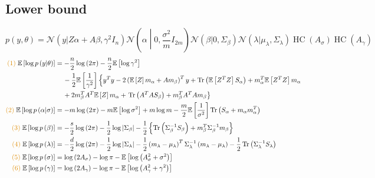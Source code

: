 \documentclass[11pt]{article}
\DeclareMathOperator{\Tr}{Tr}
\newcommand{\opn}{\operatorname}
\begin{document}
\subsection{Lower bound}
$$
  p\left(y, \theta \right) = \mathcal{N}\left(y|Z\alpha + A\beta, \gamma^{2}I_{n}\right) \mathcal{N}\left(\alpha \middle|0, \frac{\sigma^{2}}{m}I_{2m}\right)\mathcal{N}\left(\beta|0,\Sigma_{\beta}\right)\mathcal{N}\left(\lambda|\mu_{\lambda},\Sigma_{\lambda}\right)\operatorname{HC}\left(A_{\sigma}\right)\opn{HC}\left(A_{\gamma}\right)
$$
\begin{align*}
  \textcolor{myorange}{(1)}\;\mathbb{E}\left[\log p\left(y|\theta \right)\right] &= -\frac{n}{2}\log \left(2\pi \right) - \frac{n}{2}\mathbb{E}\left[\log \gamma^{2}\right] \\
  & \,\quad - \frac{1}{2}\mathbb{E}\left[\frac{1}{\gamma^{2}}\right] \left\{y^{T}y -2 \left(\mathbb{E}\left[Z\right]m_{\alpha}+Am_{\beta} \right)^{T}y + \Tr\left(\mathbb{E}\left[Z^{T}Z\right]S_{\alpha} \right) +m_{\alpha}^{T}\mathbb{E}\left[Z^{T}Z\right]m_{\alpha}\right. \\
  &\quad\, + 2m_{\beta}^{T}A^{T}\mathbb{E}\left[Z\right]m_{\alpha} + \left. \Tr\left(A^{T}A S_{\beta}\right) + m_{\beta}^{T}A^{T}A m_{\beta} \right\}\\
  \textcolor{myorange}{(2)}\;\mathbb{E}\left[\log p \left(\alpha|\sigma\right)\right] &= -m \log \left(2\pi \right) -m \mathbb{E}\left[\log \sigma^{2}\right] +m\log m -\frac{m}{2}\mathbb{E}\left[\frac{1}{\sigma^{2}}\right]\Tr \left(S_{\alpha} +m_{\alpha}m_{\alpha}^{T}\right)\\
  \textcolor{myorange}{(3)}\;\mathbb{E}\left[\log p\left(\beta\right)\right] &= -\frac{s}{2}\log \left(2\pi \right) -\frac{1}{2}\log \left|\Sigma_{\beta}\right| -\frac{1}{2}\left\{\Tr \left(\Sigma_{\beta}^{-1}S_{\beta}\right) +m_{\beta}^{T}\Sigma_{\beta}^{-1}m_{\beta} \right\}\\
  \textcolor{myorange}{(4)}\;\mathbb{E}\left[\log p\left(\lambda\right)\right] &= -\frac{d}{2}\log  \left(2\pi \right) -\frac{1}{2}\log \left|\Sigma_{\lambda}\right| -\frac{1}{2}\left(m_{\lambda}-\mu_{\lambda}\right)^{T}\Sigma_{\lambda}^{-1}\left(m_{\lambda}-\mu_{\lambda}\right) - \frac{1}{2}\Tr\left(\Sigma_{\lambda}^{-1}S_{\lambda}\right) \\
  \textcolor{myorange}{(5)}\;\mathbb{E}\left[\log p\left(\sigma\right)\right] &= \log \left(2A_{\sigma}\right) -\log \pi -\mathbb{E}\left[\log \left(A_{\sigma}^{2}+\sigma^{2}\right)\right]\\
  \textcolor{myorange}{(6)}\;\mathbb{E}\left[\log p \left(\gamma\right)\right] &= \log \left(2A_{\gamma}\right) -\log \pi -\mathbb{E}\left[\log \left(A_{\gamma}^{2}+\gamma^{2}\right)\right] \\

\end{align*}
\end{document}
